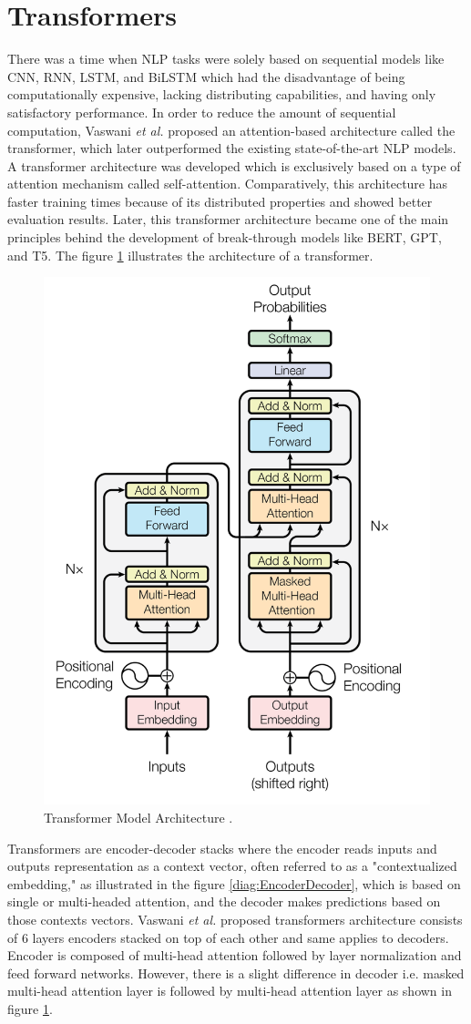 \documentclass[%
	BCOR=8mm, %
	DIV=12,
	toc=bibliography, %
	toc=listof, %
	oneside, %
	egregdoesnotlikesansseriftitles, %
	]{scrbook}
\begin{document}
\section{Transformers}
\label{section: transformers}
There was a time when NLP tasks were solely based on sequential models like CNN, RNN, LSTM, and BiLSTM which had the disadvantage of being computationally expensive, lacking distributing capabilities, and having only satisfactory performance. In order to reduce the amount of sequential computation,  Vaswani \textit{et al.} \cite{vaswani_attention_2017} proposed an attention-based architecture called the transformer, which later outperformed the existing state-of-the-art NLP models. A transformer architecture was developed which is exclusively based on a type of attention mechanism called self-attention. Comparatively, this architecture has faster training times because of its distributed properties and showed better evaluation results. 
Later, this transformer architecture became one of the main principles behind the development of break-through models like BERT, GPT, and T5. The figure \ref{diag:TransformerArchitecture} illustrates the architecture of a transformer.

\begin{figure}[h!]
    \centering
    \includegraphics[width=.50\textwidth]{img/TransformerArchitecture.png}
    \caption[Diagram of Transformer Architecture.]{Transformer Model Architecture \cite{vaswani_attention_2017}.}
    \label{diag:TransformerArchitecture}
\end{figure}
Transformers are encoder-decoder stacks where the encoder reads inputs and outputs representation as a context vector, often referred to as a "contextualized embedding," as illustrated in the figure \ref{diag:EncoderDecoder}, which is based on single or multi-headed attention, and the decoder makes predictions based on those contexts vectors. Vaswani \textit{et al.} \cite{vaswani_attention_2017} proposed transformers architecture consists of  6 layers encoders stacked on top of each other and same applies to decoders. Encoder is composed of multi-head attention followed by layer normalization and feed forward networks. However, there is a slight difference in decoder i.e. masked multi-head attention layer is followed by multi-head attention layer as shown in figure  \ref{diag:TransformerArchitecture}.
\end{document}
